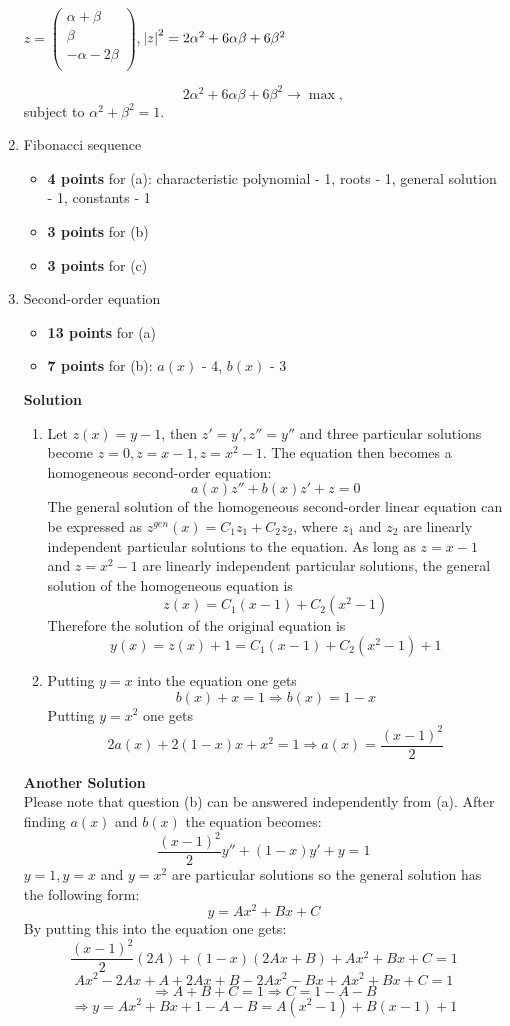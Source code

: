 \begin{enumerate}
$z = \begin{pmatrix}
  \alpha + \beta \\
  \beta \\
  -\alpha - 2\beta \\
\end{pmatrix}$, $\abs{z}^2 = 2\alpha^2 + 6\alpha\beta + 6\beta^2$

\[
  2\alpha^2 + 6\alpha\beta + 6\beta^2 \to \max,
\]
subject to $\alpha^2 + \beta^2 = 1$. 


\item Fibonacci sequence
\begin{itemize}
    \item \textbf{4 points} for (a): characteristic polynomial - 1, roots - 1, general solution - 1, constants - 1
    \item \textbf{3 points} for (b)
    \item \textbf{3 points} for (c)
\end{itemize}

\item Second-order equation
\begin{itemize}
    \item \textbf{13 points} for (a)
    \item \textbf{7 points} for (b): $a(x)$ - 4, $b(x)$ - 3
\end{itemize}

\textbf{Solution} \\
\begin{enumerate}
\item Let $z(x)=y-1$, then $z'=y', z''=y''$ and three particular solutions become $z=0, z=x-1, z=x^2-1$. The equation then becomes a homogeneous second-order equation:
\[
a(x)z''+b(x)z'+z=0
\]
The general solution of the homogeneous second-order linear equation can be expressed as $z^{gen}(x) = C_1z_1+C_2z_2$, where $z_1$ and $z_2$ are linearly independent particular solutions to the equation. As long as $z=x-1$ and $z=x^2-1$ are linearly independent particular solutions, the general solution of the homogeneous equation is
\[z(x) = C_1(x-1)+C_2(x^2-1)\]
Therefore the solution of the original equation is
\[
y(x) = z(x) + 1 = C_1(x-1)+C_2(x^2-1)+1
\]
\item Putting $y=x$ into the equation one gets
\[b(x) + x = 1 \Longrightarrow b(x) = 1-x\]
Putting $y=x^2$ one gets
\[2a(x) + 2(1-x)x + x^2 = 1 \Longrightarrow a(x) = \frac{(x-1)^2}{2}\]
\end{enumerate}


\textbf{Another Solution} \\
Please note that question (b) can be answered independently from (a).
After finding $a(x)$ and $b(x)$ the equation becomes:
\[
\frac {(x-1)^2}{2} y'' + (1-x)y' + y=1
\]
$y=1,y=x$ and $y=x^2$ are particular solutions so the general solution has the following form:
\[y=Ax^2+Bx+C\]
By putting this into the equation one gets:
\[
\frac {(x-1)^2}{2} (2A) + (1-x)(2Ax+B) + Ax^2+Bx+C=1
\]
\[ Ax^2-2Ax+A+2Ax+B-2Ax^2-Bx+Ax^2+Bx+C=1 \]
\[ \Longrightarrow A+B+C=1 \Longrightarrow C=1-A-B \]
\[
\Longrightarrow y = Ax^2+Bx+1-A-B=A(x^2-1)+B(x-1)+1
\]



\end{enumerate}
